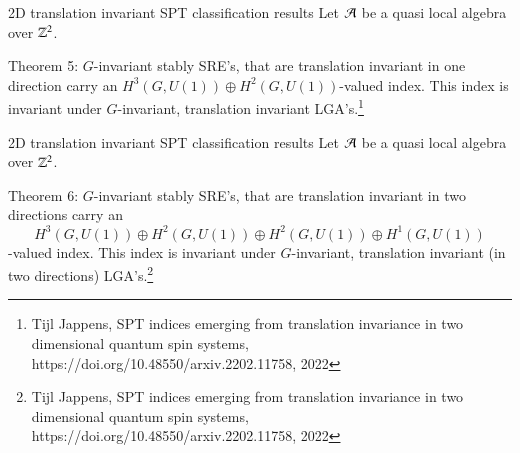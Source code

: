 \documentclass{beamer}
\begin{document}
\begin{frame}{2D translation invariant SPT classification results}
Let $\AA$ be a quasi local algebra over $\ZZ^2$.
\begin{block}{Theorem 5:}
$G$-invariant stably SRE's, that are translation invariant in one direction carry an $H^3(G,U(1))\oplus H^2(G,U(1))$-valued index. This index is invariant under $G$-invariant, translation invariant LGA's.\footnote{Tijl Jappens, SPT indices emerging from translation invariance in two dimensional quantum spin systems, https://doi.org/10.48550/arxiv.2202.11758, 2022}
\end{block}
\end{frame}

\begin{frame}{2D translation invariant SPT classification results}
Let $\AA$ be a quasi local algebra over $\ZZ^2$.
\begin{block}{Theorem 6:}
$G$-invariant stably SRE's, that are translation invariant in two directions carry an
\[H^3(G,U(1))\oplus H^2(G,U(1))\oplus H^2(G,U(1))\oplus H^1(G,U(1))\]
-valued index. This index is invariant under $G$-invariant, translation invariant (in two directions) LGA's.\footnote{Tijl Jappens, SPT indices emerging from translation invariance in two dimensional quantum spin systems, https://doi.org/10.48550/arxiv.2202.11758, 2022}
\end{block}
\end{frame}
\end{document}
